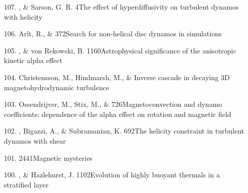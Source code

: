 \begin{itemize}
\item[107.]
\Brandenburg, \& Sarson, G. R.
{4}{The effect of hyperdiffusivity on turbulent dynamos with helicity}

\item[106.]
Arlt, R., \& \Brandenburg{}
{372}{Search for non-helical disc dynamos in simulations}

\item[105.]
\Brandenburg, \& von Rekowski, B.
{1160}{Astrophysical significance of the anisotropic kinetic alpha effect}

\item[104.]
Christensson, M., Hindmarsh, M., \& \Brandenburg{}
{Inverse cascade in decaying 3D magnetohydrodynamic turbulence}

\item[103.]
Ossendrijver, M., Stix, M., \& \Brandenburg{}
{726}{Magnetoconvection and dynamo coefficients: dependence of the
alpha effect on rotation and magnetic field}

\item[102.]
\Brandenburg, Bigazzi, A., \& Subramanian, K.
{692}{The helicity constraint in turbulent dynamos with shear}

\item[101.]
\Brandenburg{}
{2441}{Magnetic mysteries}

\item[100.]
\Brandenburg, \& Hazlehurst, J.
{1102}{Evolution of highly buoyant thermals in a stratified layer}


\end{itemize}
